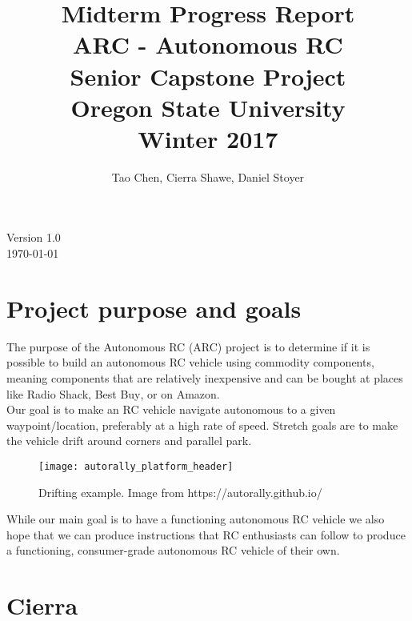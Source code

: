 \documentclass[compsoc,draftclsnofoot,onecolumn,10pt]{IEEEtran}
\date{}
\begin{document}
\begin{titlepage}
\title{
Midterm Progress Report\\
\LARGE
ARC - Autonomous RC\\
Senior Capstone Project\\
Oregon State University\\
Winter 2017
}
\author{Tao Chen, Cierra Shawe, Daniel Stoyer}
\maketitle
\begin{center}
	Version 1.0\\
	\today
\end{center}

\thispagestyle{empty} %
	
\end{titlepage}

\tableofcontents

\newpage

\section{Project purpose and goals} 
The purpose of the Autonomous RC (ARC) project is to determine if it is possible
to build an autonomous RC vehicle using commodity components, meaning components
that are relatively inexpensive and can be bought at places like Radio
Shack\textsuperscript{\textregistered}, Best Buy\textsuperscript{\textregistered}, or on Amazon. \\
Our goal is to make an RC vehicle navigate autonomous to a given
waypoint/location, preferably at a high rate of speed. Stretch goals are to
make the vehicle drift around corners and parallel park.\\

\begin{figure}[H]
   	\texttt{[image: autorally\_platform\_header]}
    \caption{Drifting example. Image from https://autorally.github.io/}
\end{figure}

While our main goal is to have a functioning autonomous RC vehicle we also hope
that we can produce instructions that RC enthusiasts can follow to produce a
functioning, consumer-grade autonomous RC vehicle of their own.

\section{Cierra}
\end{document}
